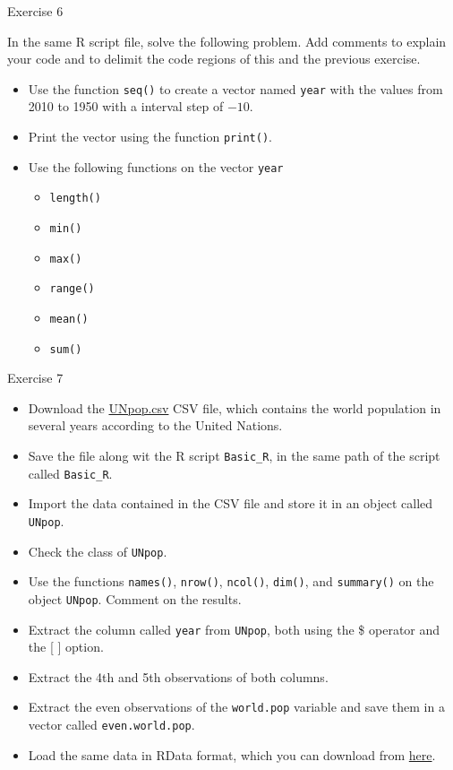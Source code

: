 \documentclass[aspectratio=169]{beamer}
\begin{document}
\begin{frame}{Exercise 6}

In the same R script file, solve the following problem. Add comments to explain your code and to delimit the code regions of this and the previous exercise.
\begin{itemize}
    \item Use the function \texttt{seq()} to create a vector named \texttt{year} with the values from 2010 to 1950 with a interval step of $-10$. 
    \item Print the vector using the function \texttt{print()}. 
    \item Use the following functions on the vector \texttt{year}
    \begin{itemize}
        \item[$\bullet$] \texttt{length()}
        \item[$\bullet$] \texttt{min()}
        \item[$\bullet$] \texttt{max()}
        \item[$\bullet$] \texttt{range()}
        \item[$\bullet$] \texttt{mean()}
        \item[$\bullet$] \texttt{sum()}
        \end{itemize}
\end{itemize}
    
\end{frame}

\begin{frame}{Exercise 7}

    \begin{itemize}
        \item Download the \href{https://github.com/kosukeimai/qss/blob/master/INTRO/UNpop.csv}{UNpop.csv} CSV file, which contains the world population in several years according to the United Nations.
        \item Save the file along wit the R script \texttt{Basic\_R}, in the same path of the script called \texttt{Basic\_R}.
        \item Import the data contained in the CSV file and store it in an object called \texttt{UNpop}.
        \item Check the class of \texttt{UNpop}.
        \item Use the functions \texttt{names()}, \texttt{nrow()}, \texttt{ncol()}, \texttt{dim()}, and \texttt{summary()} on the object \texttt{UNpop}. Comment on the results.
        \item Extract the column called \texttt{year} from \texttt{UNpop}, both using the \$ operator and the [ ] option.
        \item Extract the 4th and 5th observations of both columns.
        \item Extract the even observations of the \texttt{world.pop} variable and save them in a vector called \texttt{even.world.pop}.
        \item Load the same data in RData format, which you can download from \href{https://github.com/kosukeimai/qss/blob/master/INTRO/UNpop.RData}{here}.
    \end{itemize}
        
\end{frame}
\end{document}
